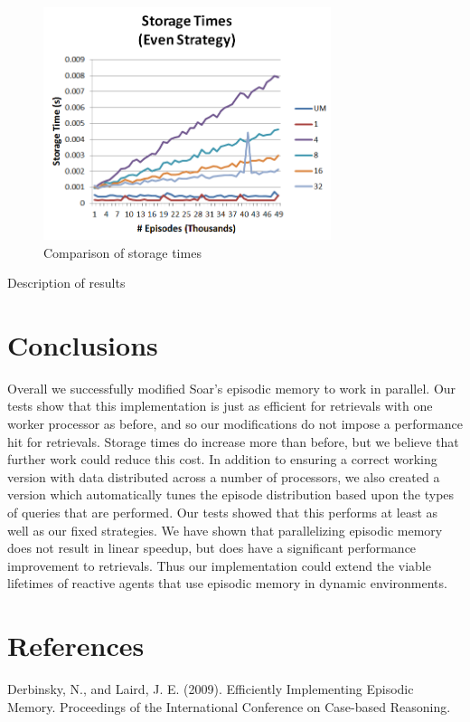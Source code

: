 \documentclass[11pt]{article} %
\begin{document}
\begin{figure}[h]
\caption{Comparison of storage times}\label{fig:storage}
\centering
\includegraphics[width=0.75\textwidth]{images/storage_even}
\end{figure}

Description of results


\section{Conclusions}
Overall we successfully modified Soar's episodic memory to work in parallel. Our tests show that this implementation 
is just as efficient for retrievals with one worker processor as before, and so our modifications do not impose a performance hit
for retrievals. Storage times do increase more than before, but we believe that further work could reduce this cost. 
In addition to ensuring a correct working version with data distributed across a number of processors, we also 
created a version which automatically tunes the episode distribution based upon the types of queries that are performed. 
Our tests showed that this performs at least as well as our fixed strategies. We have shown that parallelizing episodic memory
does not result in linear speedup, but does have a significant performance improvement to retrievals. Thus our implementation
could extend the viable lifetimes of reactive agents that use episodic memory in dynamic environments. 

\section{References}

Derbinsky, N., and Laird, J. E. (2009). Efficiently Implementing Episodic
Memory. Proceedings of the International Conference on Case-based Reasoning.
\end{document}
